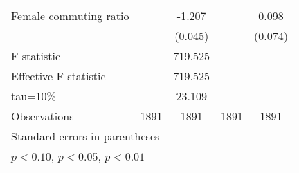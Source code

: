 \begin{tabular}{l*{4}{c}}
\addlinespace
Female commuting ratio&                     &      -1.207\sym{***}&                     &       0.098         \\
                    &                     &     (0.045)         &                     &     (0.074)         \\
\midrule
F statistic         &                     &     719.525         &                     &                     \\
Effective F statistic&                     &     719.525         &                     &                     \\
tau=10\%            &                     &      23.109         &                     &                     \\
Observations        &        1891         &        1891         &        1891         &        1891         \\
\bottomrule \multicolumn{5}{l}{\footnotesize Standard errors in parentheses}\\ \multicolumn{5}{l}{\footnotesize \sym{*} \(p<0.10\), \sym{**} \(p<0.05\), \sym{***} \(p<0.01\)} \end{tabular}
